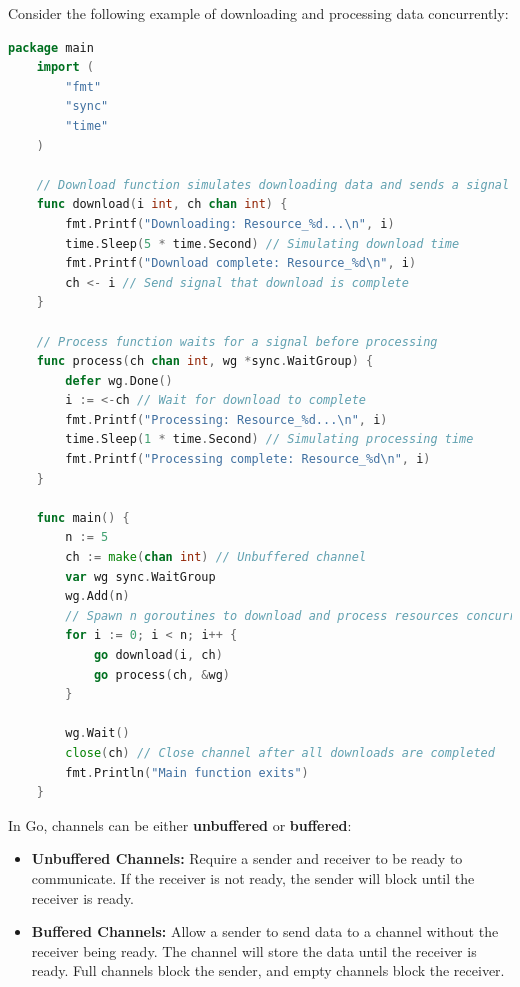 \begin{Example}

    \label{ex:channels}
Consider the following example of downloading and processing data concurrently:
\begin{lstlisting}[language=Go, caption=Using Channels to Synchronize Downloading and Processing, label={lst:channels}, numbers=none]
    package main
    import (
        "fmt"
        "sync"
        "time"
    )

    // Download function simulates downloading data and sends a signal when done
    func download(i int, ch chan int) {
        fmt.Printf("Downloading: Resource_%d...\n", i)
        time.Sleep(5 * time.Second) // Simulating download time
        fmt.Printf("Download complete: Resource_%d\n", i)
        ch <- i // Send signal that download is complete
    }

    // Process function waits for a signal before processing
    func process(ch chan int, wg *sync.WaitGroup) {
        defer wg.Done()
        i := <-ch // Wait for download to complete
        fmt.Printf("Processing: Resource_%d...\n", i)
        time.Sleep(1 * time.Second) // Simulating processing time
        fmt.Printf("Processing complete: Resource_%d\n", i)
    }

    func main() {
        n := 5
        ch := make(chan int) // Unbuffered channel
        var wg sync.WaitGroup
        wg.Add(n)
        // Spawn n goroutines to download and process resources concurrently
        for i := 0; i < n; i++ {
            go download(i, ch)
            go process(ch, &wg)
        }

        wg.Wait()
        close(ch) // Close channel after all downloads are completed
        fmt.Println("Main function exits")
    }

    \end{lstlisting}
\end{Example}

\newpage 

\begin{theo}

    In Go, channels can be either \textbf{unbuffered} or \textbf{buffered}:
    \begin{itemize}
        \item \textbf{Unbuffered Channels:} Require a sender and receiver to be ready to communicate. If the receiver is not ready, the sender will block until the receiver is ready.
        \item \textbf{Buffered Channels:} Allow a sender to send data to a channel without the receiver being ready. The channel will store the data until the receiver is ready. Full channels 
        block the sender, and empty channels block the receiver.
    \end{itemize}
\end{theo}

